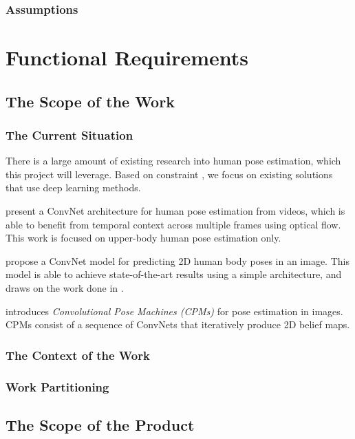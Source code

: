 \documentclass{scrreprt}
\begin{document}
\subsection{Assumptions}

\chapter{Functional Requirements}

\section{The Scope of the Work}

\subsection{The Current Situation}

There is a large amount of existing research into human pose estimation, which
this project will leverage. Based on constraint
\theHumanPoseDeepLearningConstraint, we focus on existing solutions that use
deep learning methods.

\cite{DBLP:journals/corr/PfisterCZ15} present a ConvNet architecture for human
pose estimation from videos, which is able to benefit from temporal context
across multiple frames using optical flow. This work is focused on upper-body
human pose estimation only.

\cite{DBLP:journals/corr/BelagiannisZ16} propose a ConvNet model for predicting
2D human body poses in an image. This model is able to achieve state-of-the-art
results using a simple architecture, and draws on the work done in
\cite{DBLP:journals/corr/PfisterCZ15}.

\cite{DBLP:journals/corr/WeiRKS16} introduces \textit{Convolutional Pose
Machines (CPMs)} for pose estimation in images. CPMs consist of a sequence of
ConvNets that iteratively produce 2D belief maps.

\subsection{The Context of the Work}

\subsection{Work Partitioning}

\section{The Scope of the Product}
\end{document}
